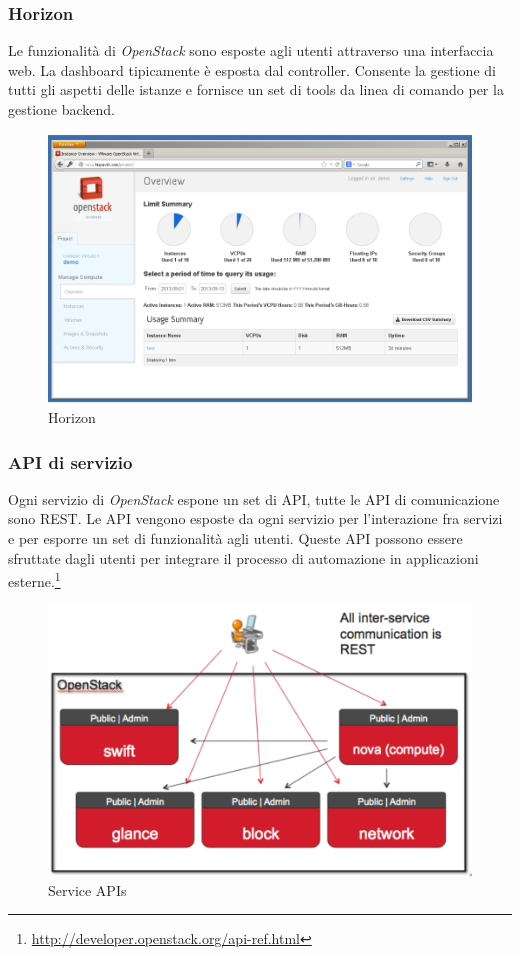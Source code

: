 \documentclass{article}
\begin{document}
\subsubsection{Horizon}
Le funzionalità di \textit{OpenStack} sono esposte agli utenti attraverso una interfaccia web. La dashboard tipicamente è esposta dal controller. Consente la gestione di tutti gli aspetti delle istanze e fornisce un set di tools da linea di comando per la gestione backend.
\begin{figure}[H]
    \centering
    \includegraphics[scale=0.6]{img/Horizon.png}
    \caption{Horizon}
\end{figure}\noindent

\subsubsection{API di servizio}
Ogni servizio di \textit{OpenStack} espone un set di API, tutte le API di comunicazione sono REST. Le API vengono esposte da ogni servizio per l'interazione fra servizi e per esporre un set di funzionalità agli utenti. Queste API possono essere sfruttate dagli utenti per integrare il processo di automazione in applicazioni esterne.\footnote{\url{http://developer.openstack.org/api-ref.html}}
\begin{figure}[H]
    \centering
    \includegraphics[scale=0.5]{img/Service API.png}
    \caption{Service APIs}
\end{figure}\noindent
\end{document}
